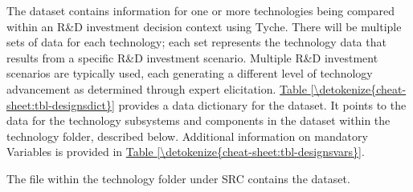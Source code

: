 \documentclass[letterpaper,10pt,english]{sphinxmanual}
\begin{document}
The  dataset contains information for one or more technologies being compared within an R\&D investment decision context using Tyche. There will be multiple sets of data for each technology; each set represents the technology data that results from a specific R\&D investment scenario.  Multiple R\&D investment scenarios are typically used, each generating a different level of technology advancement as determined through expert elicitation. \hyperref[\detokenize{cheat-sheet:tbl-designsdict}]{Table \ref{\detokenize{cheat-sheet:tbl-designsdict}}} provides a data dictionary for the  dataset. It points to the data for the technology subsystems and components in the  dataset within the technology folder, described below. Additional information on mandatory Variables is provided in \hyperref[\detokenize{cheat-sheet:tbl-designsvars}]{Table \ref{\detokenize{cheat-sheet:tbl-designsvars}}}.

The  file within the technology folder under SRC contains the  dataset.
\end{document}
